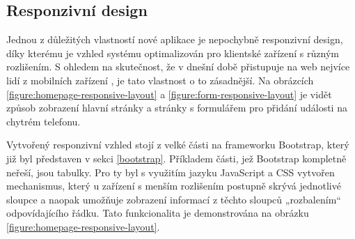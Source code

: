 \subsection{Responzivní design}
Jednou z důležitých vlastností nové aplikace je nepochybně responzivní design, díky kterému je vzhled systému optimalizován pro klientské zařízení s různým rozlišením. S ohledem na skutečnost, že v dnešní době přistupuje na web nejvíce lidí z mobilních zařízení \cite{deviceusage}, je tato vlastnost o to zásadnější. Na obrázcích \ref{figure:homepage-responsive-layout} a \ref{figure:form-responsive-layout} je vidět způsob zobrazení hlavní stránky a stránky s formulářem pro přidání události na chytrém telefonu.

Vytvořený responzivní vzhled stojí z velké části na frameworku Bootstrap, který již byl představen v sekci \ref{bootstrap}. Příkladem části, jež Bootstrap kompletně neřeší, jsou tabulky. Pro ty byl s využitím jazyku JavaScript a CSS vytvořen mechanismus, který u zařízení s menším rozlišením postupně skrývá jednotlivé sloupce a naopak umožňuje zobrazení informací z těchto sloupců „rozbalením“ odpovídajícího řádku. Tato funkcionalita je demonstrována na obrázku \ref{figure:homepage-responsive-layout}.

